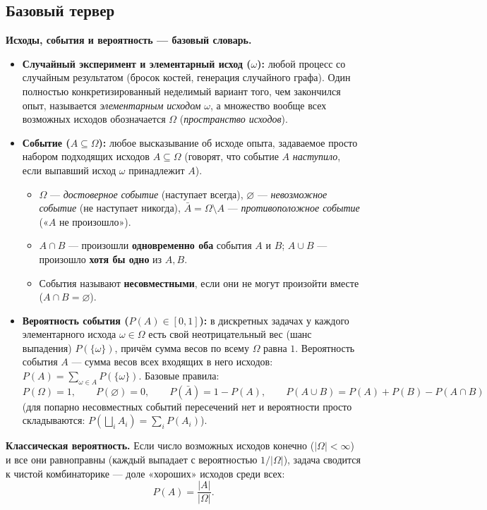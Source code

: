 \documentclass[10pt,a4paper]{article}
\renewcommand{\emptyset}{\varnothing}
\begin{document}
\subsection{Базовый тервер}

\textbf{Исходы, события и вероятность — базовый словарь.}
\begin{itemize}
  \item \textbf{Случайный эксперимент и элементарный исход ($\omega$):} любой процесс со случайным результатом (бросок костей, генерация случайного графа). Один полностью конкретизированный неделимый вариант того, чем закончился опыт, называется \emph{элементарным исходом} $\omega$, а множество вообще всех возможных исходов обозначается $\Omega$ (\emph{пространство исходов}).
  \item \textbf{Событие ($A \subseteq \Omega$):} любое высказывание об исходе опыта, задаваемое просто набором подходящих исходов $A \subseteq \Omega$ (говорят, что событие $A$ \emph{наступило}, если выпавший исход $\omega$ принадлежит $A$).
  \begin{itemize}
    \item $\Omega$ — \emph{достоверное событие} (наступает всегда), $\emptyset$ — \emph{невозможное событие} (не наступает никогда), $\bar{A} = \Omega \setminus A$ — \emph{противоположное событие} («$A$ не произошло»).
    \item $A \cap B$ — произошли \textbf{одновременно оба} события $A$ и $B$; $A \cup B$ — произошло \textbf{хотя бы одно} из $A, B$.
    \item События называют \textbf{несовместными}, если они не могут произойти вместе ($A \cap B = \emptyset$).
  \end{itemize}
  \item \textbf{Вероятность события ($P(A) \in [0, 1]$):} в дискретных задачах у каждого элементарного исхода $\omega \in \Omega$ есть свой неотрицательный вес (шанс выпадения) $P(\{\omega\})$, причём сумма весов по всему $\Omega$ равна $1$. Вероятность события $A$ — сумма весов всех входящих в него исходов: $P(A) = \sum_{\omega \in A} P(\{\omega\})$. Базовые правила:
  \[
    P(\Omega) = 1, \qquad P(\emptyset) = 0, \qquad P(\bar{A}) = 1 - P(A), \qquad
    P(A \cup B) = P(A) + P(B) - P(A \cap B)
  \]
  (для попарно несовместных событий пересечений нет и вероятности просто складываются: $P(\bigsqcup_i A_i) = \sum_i P(A_i)$).
\end{itemize}

\textbf{Классическая вероятность.} Если число возможных исходов конечно ($|\Omega| < \infty$) и все они равноправны (каждый выпадает с вероятностью $1 / |\Omega|$), задача сводится к чистой комбинаторике — доле «хороших» исходов среди всех:
\[
  P(A) = \frac{|A|}{|\Omega|}.
\]
\end{document}
